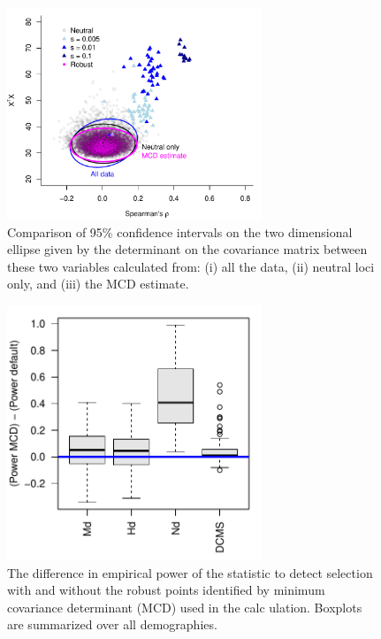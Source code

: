 \documentclass[12pt, oneside]{amsart}
\begin{document}
\newpage
\begin{figure}[h]
\begin{center}
\includegraphics[width=3in]{../figures_man2/F2-VizCovariance.pdf}
\end{center}
\caption[]{Comparison of 95\% confidence intervals on the two dimensional ellipse given by the determinant on the covariance matrix between these two variables calculated from: (i) all the data, (ii) neutral loci only, and (iii) the MCD estimate.}
 \label{fig:???}
\end{figure}

\newpage
\begin{figure}[h]
\begin{center}
\includegraphics[width=3in]{../figures_man2/F3-LandsharcComparePowerMCDminusPowerDefault.pdf}
\end{center}
\caption[]{The difference in empirical power of the statistic to detect selection with and without the robust points identified by minimum covariance determinant (MCD) used in the calc ulation. Boxplots are summarized over all demographies.}
 \label{fig:???}
\end{figure}
\end{document}
